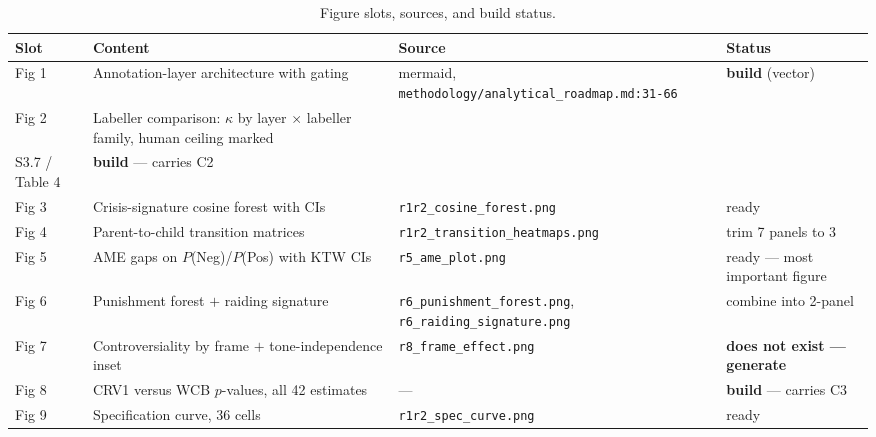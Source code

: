 \begin{table}[h]
  \caption{Figure slots, sources, and build status.}
  \label{tab:figureplan}
  \footnotesize
  \begin{tabular}{@{}lp{4.0cm}p{4.4cm}p{3.2cm}@{}}
    \toprule
    Slot & Content & Source & Status \\
    \midrule
    Fig 1 & Annotation-layer architecture with gating & mermaid, \texttt{methodology/analytical\_roadmap.md:31-66} & \textbf{build} (vector) \\
    Fig 2 & Labeller comparison: $\kappa$ by layer $\times$ labeller family, human ceiling marked & \\S3.7 / Table 4 & \textbf{build} --- carries C2 \\
    Fig 3 & Crisis-signature cosine forest with CIs & \texttt{r1r2\_cosine\_forest.png} & ready \\
    Fig 4 & Parent-to-child transition matrices & \texttt{r1r2\_transition\_heatmaps.png} & trim 7 panels to 3 \\
    Fig 5 & AME gaps on $P$(Neg)/$P$(Pos) with KTW CIs & \texttt{r5\_ame\_plot.png} & ready --- most important figure \\
    Fig 6 & Punishment forest $+$ raiding signature & \texttt{r6\_punishment\_forest.png}, \texttt{r6\_raiding\_signature.png} & combine into 2-panel \\
    Fig 7 & Controversiality by frame $+$ tone-independence inset & \texttt{r8\_frame\_effect.png} & \textbf{does not exist --- generate} \\
    Fig 8 & CRV1 versus WCB $p$-values, all 42 estimates & --- & \textbf{build} --- carries C3 \\
    Fig 9 & Specification curve, 36 cells & \texttt{r1r2\_spec\_curve.png} & ready \\
    \bottomrule
  \end{tabular}
\end{table}
